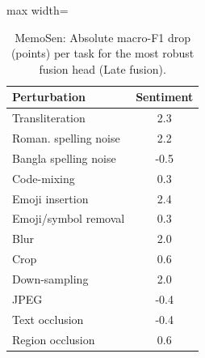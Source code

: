 \begin{table}[t]
\centering
\small
\caption{MemoSen: Absolute macro-F1 drop (points) per task for the most robust fusion head (Late fusion).}
\label{tab:rob_task_fine_memosen}
\begin{adjustbox}{max width=\columnwidth}
\begin{tabular}{lc}
\toprule
Perturbation & Sentiment \\
\midrule
Transliteration & 2.3 \\
Roman. spelling noise & 2.2 \\
Bangla spelling noise & -0.5 \\
Code-mixing & 0.3 \\
Emoji insertion & 2.4 \\
Emoji/symbol removal & 0.3 \\
Blur & 2.0 \\
Crop & 0.6 \\
Down-sampling & 2.0 \\
JPEG & -0.4 \\
Text occlusion & -0.4 \\
Region occlusion & 0.6 \\
\bottomrule
\end{tabular}
\end{adjustbox}
\end{table}
